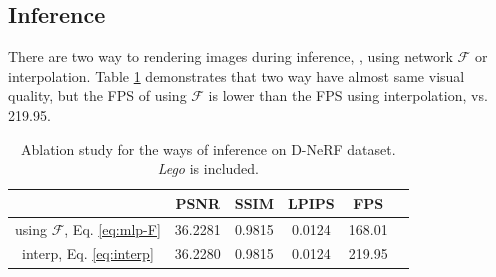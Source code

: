 \subsection{Inference}
There are two way to rendering images during inference, \ie, using network $\mathcal{F}$ or interpolation. Table \ref{tab:ab-inter} demonstrates that two way have almost same visual quality, but the FPS of using $\mathcal{F}$ is lower than the FPS using interpolation,  vs. 219.95.


\begin{table}[htb]
    \centering
    \caption{Ablation study for the ways of inference on D-NeRF dataset. \textit{Lego} is included.}
    \label{tab:ab-inter}
    \begin{tabular}{c*{5}{c}}
    \toprule
    & PSNR & SSIM & LPIPS & FPS \\ \midrule
       using $\mathcal{F}$, Eq. \ref{eq:mlp-F} & 36.2281 & 0.9815 & 0.0124 &  168.01 \\
        interp, Eq. \ref{eq:interp}   & 36.2280 & 0.9815 & 0.0124 & 219.95 \\
        \bottomrule
    \end{tabular}
\end{table}

